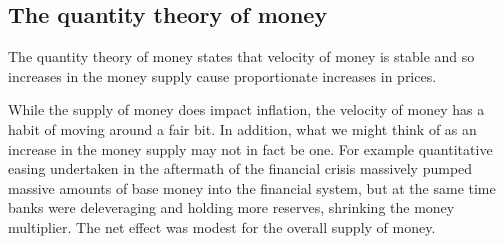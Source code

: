 
\subsection{The quantity theory of money}

The quantity theory of money states that velocity of money is stable and so increases in the money supply cause proportionate increases in prices.

While the supply of money does impact inflation, the velocity of money has a habit of moving around a fair bit. In addition, what we might think of as an increase in the money supply may not in fact be one. For example quantitative easing undertaken in the aftermath of the financial crisis massively pumped massive amounts of base money into the financial system, but at the same time banks were deleveraging and holding more reserves, shrinking the money multiplier. The net effect was modest for the overall supply of money.

